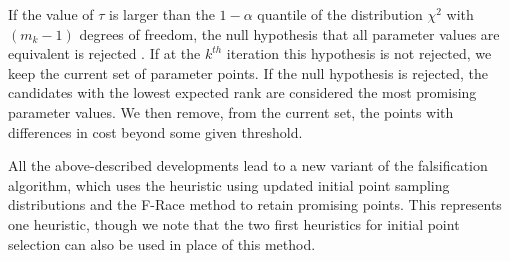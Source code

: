 If the value of $\tau$ is larger than the $1 - \alpha$ quantile of the distribution $\chi^2$  with $(m_k - 1)$ degrees of freedom, the null hypothesis that all parameter values are equivalent is rejected \cite{AP91}. If at the $k^{th}$ iteration this hypothesis is not rejected, we keep the current set of parameter points. If the null hypothesis is rejected, the candidates with the lowest expected rank are considered the most promising parameter values. We then remove, from the current set, the points with differences in cost beyond some given threshold.  
 
All the above-described developments lead to a new variant of the falsification algorithm, which uses the heuristic using updated initial point sampling distributions and the F-Race method to retain promising points. This represents one heuristic, though we note that the two first heuristics for initial point selection can also be used in place of this method.%

